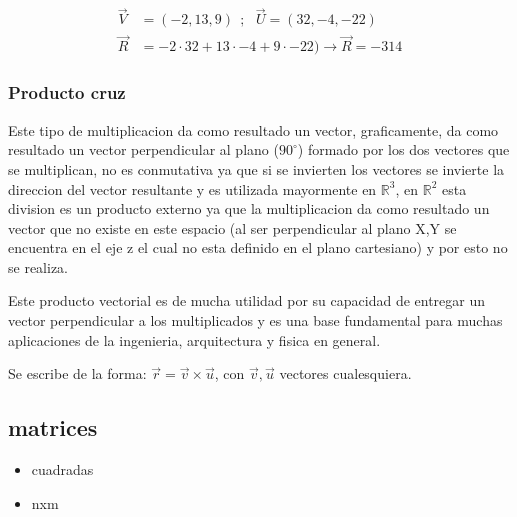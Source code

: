    \begin{align*}
        \vec{V}& =(-2,13,9)  \ \ ;\ \ \   \vec{U} =(32,-4,-22)		\\
        \vec{R}&= -2\cdot32 + 13\cdot-4 +9\cdot-22 )  \rightarrow \vec{R} = -314
    \end{align*}

    \subsubsection{Producto cruz}

    Este tipo de multiplicacion da como resultado un vector, graficamente, da
    como resultado un vector perpendicular al plano ($90^\circ$) formado por
    los dos vectores
    que se multiplican, no es conmutativa ya que si se invierten los vectores
    se invierte la direccion del vector resultante y es utilizada mayormente en
    $\mathbb{R}^3$, en $\mathbb{R}^2$ esta division es un producto externo ya
    que la multiplicacion da como resultado un vector que no existe en este espacio
    (al ser perpendicular al plano X,Y se encuentra en el eje z el cual no esta
    definido en el plano cartesiano) y por esto no se realiza.

    Este producto vectorial es de mucha utilidad por su capacidad de entregar
    un vector perpendicular a los multiplicados y es una base fundamental para
    muchas aplicaciones de la ingenieria, arquitectura y fisica en general.

    Se escribe de la forma: $\vec{r} = \vec{v}\times\vec{u}$, con
    $\vec{v},\vec{u}$ vectores cualesquiera.








\subsection{matrices}
\begin{itemize}
    \item cuadradas
    \item nxm
\end{itemize}
